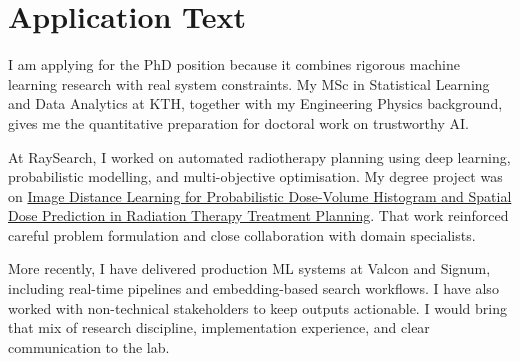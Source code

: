 \documentclass[11pt,a4paper]{article}
\begin{document}
\section*{Application Text}

I am applying for the PhD position because it combines rigorous machine learning research with real system constraints. My MSc in Statistical Learning and Data Analytics at KTH, together with my Engineering Physics background, gives me the quantitative preparation for doctoral work on trustworthy AI.

At RaySearch, I worked on automated radiotherapy planning using deep learning, probabilistic modelling, and multi-objective optimisation. My degree project was on \href{https://kth.diva-portal.org/smash/get/diva2:1431327/FULLTEXT02.pdf}{Image Distance Learning for Probabilistic Dose-Volume Histogram and Spatial Dose Prediction in Radiation Therapy Treatment Planning}. That work reinforced careful problem formulation and close collaboration with domain specialists.

More recently, I have delivered production ML systems at Valcon and Signum, including real-time pipelines and embedding-based search workflows. I have also worked with non-technical stakeholders to keep outputs actionable. I would bring that mix of research discipline, implementation experience, and clear communication to the lab.
\end{document}
